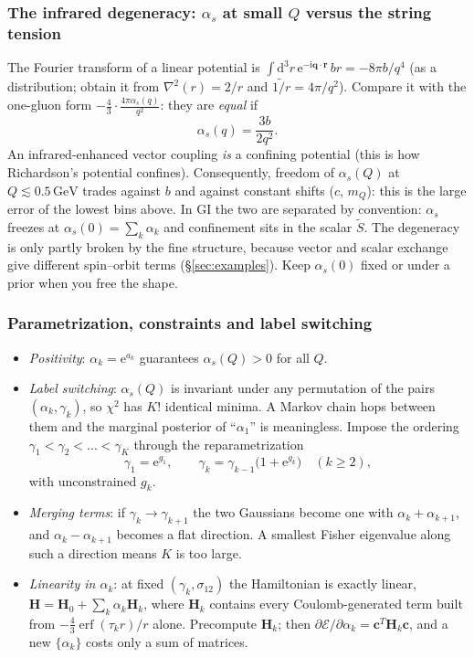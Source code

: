 \documentclass[11pt,a4paper]{article}
\numberwithin{equation}{section}
\theoremstyle{definition}
\theoremstyle{plain}
\theoremstyle{remark}
\numberwithin{algorithm}{section}
\newcommand{\vr}{\bm r}
\newcommand{\vq}{\bm q}
\newcommand{\as}{\alpha_s}
\newcommand{\dd}{\mathrm{d}}
\newcommand{\ii}{\mathrm{i}}
\newcommand{\ee}{\mathrm{e}}
\newcommand{\erf}{\operatorname{erf}}
\newcommand{\GeV}{\,\mathrm{GeV}}
\newcommand{\mH}{\mathbf H}
\newcommand{\vc}{\bm c}
\begin{document}
\subsubsection{\texorpdfstring{The infrared degeneracy: $\as$ at small $Q$ versus the string tension}{The infrared degeneracy: alpha\_s at small Q versus the string tension}}
The Fourier transform of a linear potential is $\int\dd^3r\,\ee^{-\ii\vq\cdot\vr}\,br=-8\pi b/q^4$ (as a distribution; obtain it from $\nabla^2(r)=2/r$ and $\widetilde{1/r}=4\pi/q^2$). Compare it with the one-gluon form $-\frac43\cdot\frac{4\pi\as(q)}{q^2}$: they are \emph{equal} if
\begin{equation}
\as(q)=\frac{3b}{2q^2}.
\end{equation}
An infrared-enhanced vector coupling \emph{is} a confining potential (this is how Richardson's potential confines). Consequently, freedom of $\as(Q)$ at $Q\lesssim0.5\GeV$ trades against $b$ and against constant shifts ($c$, $m_Q$): this is the large error of the lowest bins above. In GI the two are separated by convention: $\as$ freezes at $\as(0)=\sum_k\alpha_k$ and confinement sits in the scalar $\tilde S$. The degeneracy is only partly broken by the fine structure, because vector and scalar exchange give different spin--orbit terms (\S\ref{sec:examples}). Keep $\as(0)$ fixed or under a prior when you free the shape.

\subsubsection{Parametrization, constraints and label switching}
\begin{itemize}[leftmargin=1.3em,itemsep=2pt]
\item \emph{Positivity}: $\alpha_k=\ee^{a_k}$ guarantees $\as(Q)>0$ for all $Q$.
\item \emph{Label switching}: $\as(Q)$ is invariant under any permutation of the pairs $(\alpha_k,\gamma_k)$, so $\chi^2$ has $K!$ identical minima. A Markov chain hops between them and the marginal posterior of ``$\alpha_1$'' is meaningless. Impose the ordering $\gamma_1<\gamma_2<\dots<\gamma_K$ through the reparametrization
\[
\gamma_1=\ee^{g_1},\qquad \gamma_k=\gamma_{k-1}\big(1+\ee^{g_k}\big)\quad(k\ge2),
\]
with unconstrained $g_k$.
\item \emph{Merging terms}: if $\gamma_k\to\gamma_{k+1}$ the two Gaussians become one with $\alpha_k+\alpha_{k+1}$, and $\alpha_k-\alpha_{k+1}$ becomes a flat direction. A smallest Fisher eigenvalue along such a direction means $K$ is too large.
\item \emph{Linearity in $\alpha_k$}: at fixed $(\gamma_k,\sigma_{12})$ the Hamiltonian is exactly linear, $\mH=\mH_0+\sum_k\alpha_k\mH_k$, where $\mH_k$ contains every Coulomb-generated term built from $-\frac43\erf(\tau_kr)/r$ alone. Precompute $\mH_k$; then $\partial\mathcal E/\partial\alpha_k=\vc^T\mH_k\vc$, and a new $\{\alpha_k\}$ costs only a sum of matrices.
\end{itemize}
\end{document}

